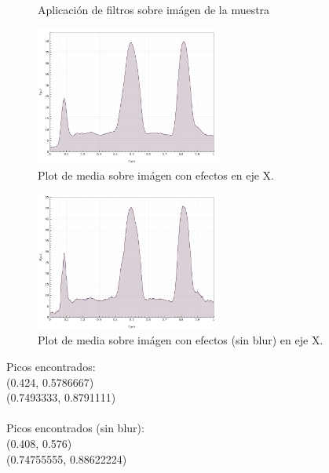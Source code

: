 \begin{itemize}
\begin{figure}[H]
	\caption{Aplicaci\'on de filtros sobre im\'agen de la muestra}
	\centering
	\end{figure}
	\begin{figure}[H]
	  \vspace{-0.2cm}
	  \centering
	  \includegraphics[width=230px]{imagenes-jtlc/experimento/search-peaks/4/plot-x}
	  \centering
	  \vspace{-0.4cm}
	  \caption{Plot de media sobre im\'agen con efectos en eje X.}
	  \label{fig:sp-4-plot-x-no-blur---repetido}
	  \vspace{-0.15cm}
	\end{figure}
	\begin{figure}[H]
	  \vspace{-0.2cm}
	  \centering
	  \includegraphics[width=230px]{imagenes-jtlc/experimento/search-peaks/4/plot-x-no-blur}
	  \centering
	  \vspace{-0.4cm}
	  \caption{Plot de media sobre im\'agen con efectos (sin blur) en eje X.}
	  \label{fig:sp-4-plot-x-no-blur}
	  \vspace{-0.15cm}
	\end{figure}
	Picos encontrados: \\
	(0.424, 0.5786667)\\ 
	(0.7493333, 0.8791111) \\ \\
	Picos encontrados (sin blur): \\
	(0.408, 0.576)\\
	(0.74755555, 0.88622224)\\
	

\end{itemize}
